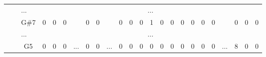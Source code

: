 \documentclass[12pt]{article}
\begin{document}
\begin{table}[!ht]
{\begin{tabular}{clcccccccccccccccccccccc}
								   & \multicolumn{1}{l|}{}                   & \multicolumn{1}{l|}{...}  & \multicolumn{21}{c|}{...}                                                                                                                                                                                                                                                                                                                                                                                                                                                                                                                                                                                                                 \\ \cline{3-6} \cline{8-9} \cline{11-20} \cline{22-24} 
								   & \multicolumn{1}{l|}{}                   & \multicolumn{1}{c|}{G\#7} & \multicolumn{1}{c|}{0}    & \multicolumn{1}{c|}{0}    & \multicolumn{1}{c|}{0}    & \multicolumn{1}{c|}{}                     & \multicolumn{1}{c|}{0}    & \multicolumn{1}{c|}{0}  & \multicolumn{1}{c|}{}                     & \multicolumn{1}{c|}{0}  & \multicolumn{1}{c|}{0}  & \multicolumn{1}{c|}{0}  & \multicolumn{1}{c|}{1}  & \multicolumn{1}{c|}{0}    & \multicolumn{1}{c|}{0}    & \multicolumn{1}{c|}{0}    & \multicolumn{1}{c|}{0}    & \multicolumn{1}{c|}{0}    & \multicolumn{1}{c|}{0}    & \multicolumn{1}{c|}{}                     & \multicolumn{1}{c|}{0}  & \multicolumn{1}{c|}{0}  & \multicolumn{1}{c|}{0}  \\ \cline{3-6} \cline{8-9} \cline{11-20} \cline{22-24} 
								   & \multicolumn{1}{l|}{}                   & \multicolumn{1}{l|}{...}  & \multicolumn{21}{c|}{...}                                                                                                                                                                                                                                                                                                                                                                                                                                                                                                                                                                                                                 \\ \cline{3-6} \cline{8-9} \cline{11-20} \cline{22-24} 
								   & \multicolumn{1}{l|}{}                   & \multicolumn{1}{c|}{G5}   & \multicolumn{1}{c|}{0}    & \multicolumn{1}{c|}{0}    & \multicolumn{1}{c|}{0}    & \multicolumn{1}{c|}{\multirow{3}{*}{...}} & \multicolumn{1}{c|}{0}    & \multicolumn{1}{c|}{0}  & \multicolumn{1}{c|}{\multirow{3}{*}{...}} & \multicolumn{1}{c|}{0}  & \multicolumn{1}{c|}{0}  & \multicolumn{1}{c|}{0}  & \multicolumn{1}{c|}{0}  & \multicolumn{1}{c|}{0}    & \multicolumn{1}{c|}{0}    & \multicolumn{1}{c|}{0}    & \multicolumn{1}{c|}{0}    & \multicolumn{1}{c|}{0}    & \multicolumn{1}{c|}{0}    & \multicolumn{1}{c|}{\multirow{3}{*}{...}} & \multicolumn{1}{c|}{8}  & \multicolumn{1}{c|}{0}  & \multicolumn{1}{c|}{0}  \\ \cline{3-6} \cline{8-9} \cline{11-20} \cline{22-24} 

\end{tabular}}
\end{table}
\end{document}
